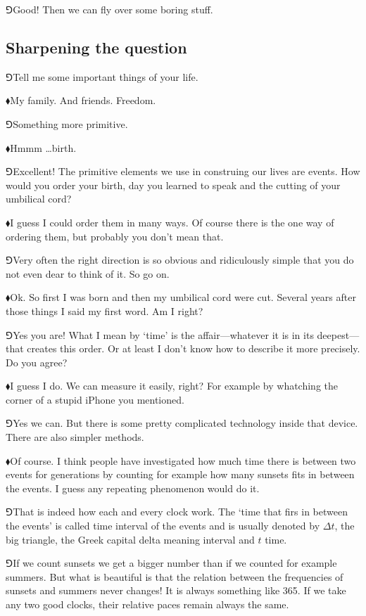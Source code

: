 \documentclass[10pt,oneside%
]{memoir}
\newcommand{\hea}{\(\blacklozenge\)\;}
\newcommand{\heb}{\(\Game\)\;}
\begin{document}
\heb Good! Then we can fly over some boring stuff.
\subsection{Sharpening the question}
\heb Tell me some important things of your life.

\hea My family. And friends. Freedom.

\heb Something more primitive.

\hea Hmmm \ldots birth.

\heb Excellent! The primitive elements we use in construing our lives are events. How would you order your birth, day you learned to speak and the cutting of your umbilical cord?

\hea I guess I could order them in many ways. Of course there is the one way of ordering them, but probably you don't mean that.

\heb Very often the right direction is so obvious and ridiculously simple that you do not even dear to think of it. So go on.

\hea Ok. So first I was born and then my umbilical cord were cut. Several years after those things I said my first word. Am I right?

\heb Yes you are! What I mean by `time' is the affair---whatever it is in its deepest---that creates this order. Or at least I don't know how to describe it more precisely. Do you agree?

\hea I guess I do. We can measure it easily, right? For example by whatching the corner of a stupid iPhone you mentioned.

\heb Yes we can. But there is some pretty complicated technology inside that device. There are also simpler methods.

\hea Of course. I think people have investigated how much time there is between two events for generations by counting for example how many sunsets fits in between the events. I guess any repeating phenomenon would do it.

\heb That is indeed how each and every clock work. The `time that firs in between the events' is called time interval of the events and is usually denoted by \(\Delta t\), the big triangle, the Greek capital delta meaning interval and \(t\) time.

\heb If we count sunsets we get a bigger number than if we counted for example summers. But what is beautiful is that the relation between the frequencies of sunsets and summers never changes! It is always something like 365. If we take any two good clocks, their relative paces remain always the same.
\end{document}
